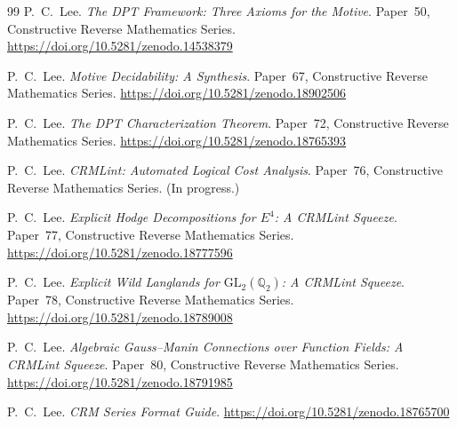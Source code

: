 \documentclass[11pt]{article}
\theoremstyle{plain}
\theoremstyle{definition}
\theoremstyle{remark}
\newcommand{\Q}{\mathbb{Q}}
\newcommand{\GL}{\mathrm{GL}}
\begin{document}
\begin{thebibliography}{99}
P.~C.~Lee.
\newblock \emph{The DPT Framework: Three Axioms for the Motive}.
\newblock Paper~50, Constructive Reverse Mathematics Series.
\newblock \url{https://doi.org/10.5281/zenodo.14538379}

P.~C.~Lee.
\newblock \emph{Motive Decidability: A Synthesis}.
\newblock Paper~67, Constructive Reverse Mathematics Series.
\newblock \url{https://doi.org/10.5281/zenodo.18902506}

P.~C.~Lee.
\newblock \emph{The DPT Characterization Theorem}.
\newblock Paper~72, Constructive Reverse Mathematics Series.
\newblock \url{https://doi.org/10.5281/zenodo.18765393}

P.~C.~Lee.
\newblock \emph{CRMLint: Automated Logical Cost Analysis}.
\newblock Paper~76, Constructive Reverse Mathematics Series.
\newblock (In progress.)

P.~C.~Lee.
\newblock \emph{Explicit Hodge Decompositions for $E^4$:
  A CRMLint Squeeze}.
\newblock Paper~77, Constructive Reverse Mathematics Series.
\newblock \url{https://doi.org/10.5281/zenodo.18777596}

P.~C.~Lee.
\newblock \emph{Explicit Wild Langlands for $\GL_2(\Q_2)$:
  A CRMLint Squeeze}.
\newblock Paper~78, Constructive Reverse Mathematics Series.
\newblock \url{https://doi.org/10.5281/zenodo.18789008}

P.~C.~Lee.
\newblock \emph{Algebraic Gauss--Manin Connections over
  Function Fields: A CRMLint Squeeze}.
\newblock Paper~80, Constructive Reverse Mathematics Series.
\newblock \url{https://doi.org/10.5281/zenodo.18791985}

P.~C.~Lee.
\newblock \emph{CRM Series Format Guide}.
\newblock \url{https://doi.org/10.5281/zenodo.18765700}

\end{thebibliography}
\end{document}
